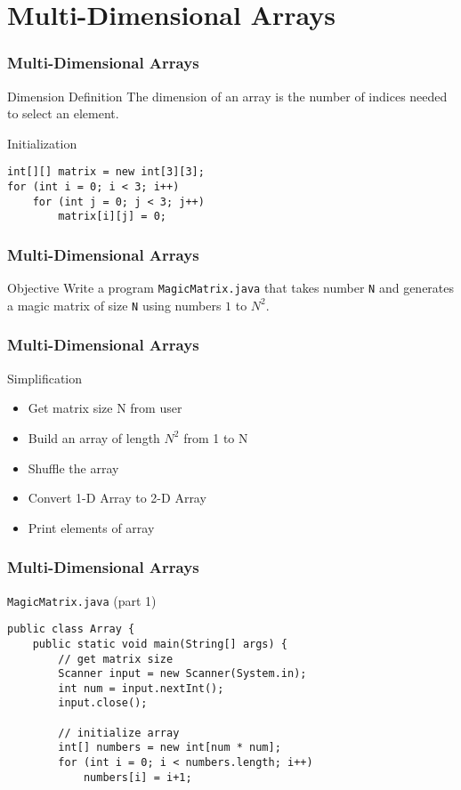 \documentclass[10pt, compress]{beamer}
\begin{document}
\section{Multi-Dimensional Arrays}

\begin{frame}[fragile]
	\frametitle{Multi-Dimensional Arrays}
	\begin{block}{Dimension Definition}
		The dimension of an array is the number of indices needed to select an element.
	\end{block}
	\begin{block}{Initialization}
		\begin{verbatim}
int[][] matrix = new int[3][3];
for (int i = 0; i < 3; i++)
	for (int j = 0; j < 3; j++)
		matrix[i][j] = 0;
		\end{verbatim}
	\end{block}
\end{frame}

\begin{frame}[fragile]
	\frametitle{Multi-Dimensional Arrays}
	\begin{block}{Objective}
		Write a program \texttt{MagicMatrix.java} that takes number \texttt{N} and generates a magic matrix of size \texttt{N} using numbers $1$ to $N^2$.
	\end{block}
\end{frame}

\begin{frame}[fragile]
	\frametitle{Multi-Dimensional Arrays}
	\begin{block}{Simplification}
		\begin{itemize}
			\item[] Get matrix size N from user
			\item[] Build an array of length $N^2$ from 1 to N
			\item[] Shuffle the array
			\item[] Convert 1-D Array to 2-D Array
			\item[] Print elements of array
		\end{itemize}
	\end{block}
\end{frame}

\begin{frame}[fragile]
	\frametitle{Multi-Dimensional Arrays}
	\begin{block}{\texttt{MagicMatrix.java} (part 1)}
		\begin{verbatim}
public class Array {
	public static void main(String[] args) {
		// get matrix size
		Scanner input = new Scanner(System.in);
		int num = input.nextInt();
		input.close();

		// initialize array
		int[] numbers = new int[num * num];
		for (int i = 0; i < numbers.length; i++)
			numbers[i] = i+1;
		\end{verbatim}
	\end{block}
\end{frame}
\end{document}
